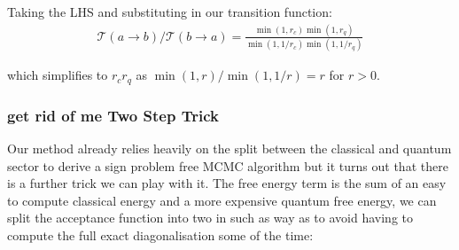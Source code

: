 Taking the LHS and substituting in our transition function: \[\begin{aligned}
\mathcal{T}(a \to b)/\mathcal{T}(b \to a) = \frac{\min\left(1, r_c\right) \min\left(1, r_q\right)}{ \min\left(1, 1/r_c\right) \min\left(1, 1/r_q\right)}\end{aligned}\]

which simplifies to \(r_c r_q\) as \(\min(1,r)/\min(1,1/r) = r\) for \(r > 0\).

\hypertarget{get-rid-of-me-two-step-trick}{%
\subsubsection{get rid of me Two Step Trick}\label{get-rid-of-me-two-step-trick}}

Our method already relies heavily on the split between the classical and quantum sector to derive a sign problem free MCMC algorithm but it turns out that there is a further trick we can play with it. The free energy term is the sum of an easy to compute classical energy and a more expensive quantum free energy, we can split the acceptance function into two in such as way as to avoid having to compute the full exact diagonalisation some of the time:

\begin{Shaded}
\begin{Highlighting}[]

\OperatorTok{=}

 
\OperatorTok{=}

\OperatorTok{=}
    \OperatorTok{{-}}\OperatorTok{*}\OperatorTok{\textless{}}\NormalTok{,}\NormalTok{):}
\OperatorTok{=}
    
        \OperatorTok{{-}}\OperatorTok{*}\OperatorTok{\textless{}}\NormalTok{,}\NormalTok{):}
\OperatorTok{=}
    
\OperatorTok{=}
    
\end{Highlighting}
\end{Shaded}

